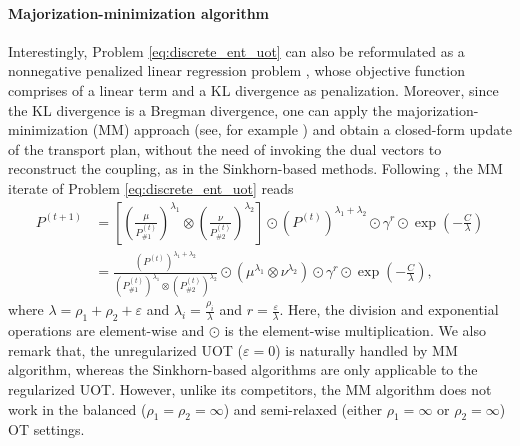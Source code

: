 \paragraph{Majorization-minimization algorithm} Interestingly, Problem \eqref{eq:discrete_ent_uot}
can also be reformulated as a nonnegative penalized linear regression problem \citep{Chapel21},
whose objective function comprises of a linear term and a KL divergence as penalization.
Moreover, since the KL divergence is a Bregman divergence, one can apply the
majorization-minimization (MM) approach (see, for example \citep{Hunter04,Sun17}) and obtain
a closed-form update of the transport plan, without the need of invoking the dual vectors
to reconstruct the coupling, as in the Sinkhorn-based methods. Following \citep{Chapel21},
the MM iterate of Problem \eqref{eq:discrete_ent_uot} reads
\begin{align}
    P^{(t+1)} &= \left[ \left( \frac{\mu}{P^{(t)}_{\# 1}}\right)^{\lambda_1} \otimes
    \left( \frac{\nu}{P^{(t)}_{\# 2}}\right)^{\lambda_2} \right] \odot
    (P^{(t)})^{\lambda_1 + \lambda_2} \odot \gamma^r \odot \exp\left(-\frac{C}{\lambda} \right) \\
    &= \frac{(P^{(t)})^{\lambda_1 + \lambda_2}}{(P^{(t)}_{\# 1})^{\lambda_1}
    \otimes (P^{(t)}_{\# 2})^{\lambda_2}}
    \odot \left( \mu^{\lambda_1} \otimes \nu^{\lambda_2} \right) \odot \gamma^r
    \odot \exp\left(-\frac{C}{\lambda} \right),
\end{align}
where $\lambda = \rho_1 + \rho_2 + \varepsilon$ and
$\lambda_i = \frac{\rho_i}{\lambda}$ and $r = \frac{\varepsilon}{\lambda}$.
Here, the division and exponential operations are element-wise and
$\odot$ is the element-wise multiplication. We also remark that,
the unregularized UOT ($\varepsilon = 0$) is naturally handled by MM algorithm,
whereas the Sinkhorn-based algorithms are only applicable to the regularized UOT. However,
unlike its competitors, the MM algorithm does not work in the balanced ($\rho_1=\rho_2=\infty$)
and semi-relaxed (either $\rho_1=\infty$ or $\rho_2=\infty$) OT settings.

